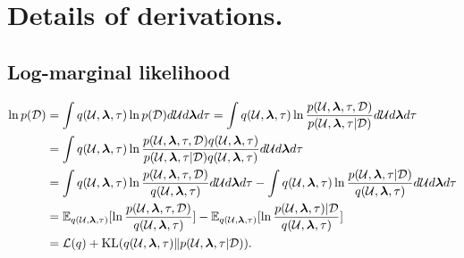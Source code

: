 
\appendix
\onecolumn
\section{Details of derivations.}
\label{ap:derivation}
\subsection{Log-marginal likelihood}
\label{ap:lml}
\begin{equation}
\begin{split}
    \ln p(\mathcal{D}) &= \int q(\mathcal{U}, \boldsymbol{\lambda}, \tau)\ln p(\mathcal{D}) d\mathcal{U}d \boldsymbol{\lambda}d\tau = \int q(\mathcal{U}, \boldsymbol{\lambda}, \tau) \ln \frac{p(\mathcal{U}, \boldsymbol{\lambda}, \tau, \mathcal{D})}{p( \mathcal{U}, \boldsymbol{\lambda}, \tau|\mathcal{D})}d\mathcal{U}d \boldsymbol{\lambda}d\tau \\
    &=\int q(\mathcal{U}, \boldsymbol{\lambda}, \tau) \ln \frac{p(\mathcal{U}, \boldsymbol{\lambda}, \tau, \mathcal{D})q(\mathcal{U}, \boldsymbol{\lambda}, \tau)}{p( \mathcal{U}, \boldsymbol{\lambda}, \tau|\mathcal{D})q(\mathcal{U}, \boldsymbol{\lambda}, \tau)}d\mathcal{U}d \boldsymbol{\lambda}d\tau \\
    &=\int q(\mathcal{U}, \boldsymbol{\lambda}, \tau) \ln \frac{p(\mathcal{U}, \boldsymbol{\lambda}, \tau, \mathcal{D})}{q(\mathcal{U}, \boldsymbol{\lambda}, \tau)}d\mathcal{U}d \boldsymbol{\lambda}d\tau - \int q(\mathcal{U}, \boldsymbol{\lambda}, \tau) \ln \frac{p( \mathcal{U}, \boldsymbol{\lambda}, \tau|\mathcal{D})}{q(\mathcal{U}, \boldsymbol{\lambda}, \tau)}d\mathcal{U}d \boldsymbol{\lambda}d\tau \\
    & = \mathbb{E}_{q(\mathcal{U}, \boldsymbol{\lambda}, \tau)}[\ln \frac{p(\mathcal{U}, \boldsymbol{\lambda}, \tau, \mathcal{D})}{q(\mathcal{U}, \boldsymbol{\lambda}, \tau)}] - \mathbb{E}_{q(\mathcal{U}, \boldsymbol{\lambda}, \tau)}[\ln \frac{p(\mathcal{U}, \boldsymbol{\lambda}, \tau)|\mathcal{D}}{q(\mathcal{U}, \boldsymbol{\lambda}, \tau)}]\\
    &=\mathcal{L}(q) + \text{KL}(q(\mathcal{U}, \boldsymbol{\lambda}, \tau)\|p(\mathcal{U}, \boldsymbol{\lambda}, \tau|\mathcal{D})).
    \end{split}
\end{equation}
